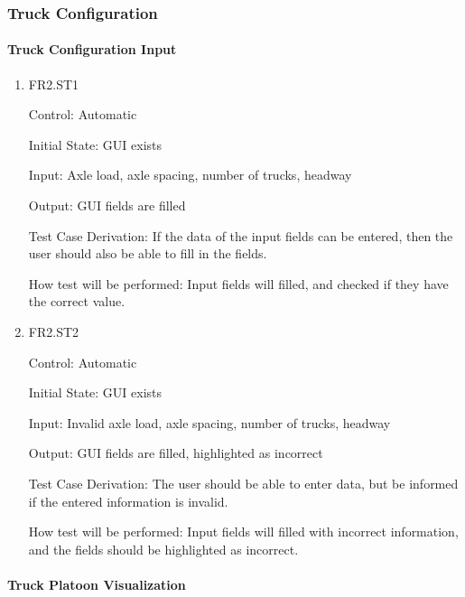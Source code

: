 \documentclass[12pt, titlepage]{article}
\begin{document}
\subsubsection{Truck Configuration}

\paragraph{Truck Configuration Input}

\begin{enumerate}

  \item{FR2.ST1\\}

  Control: Automatic

  Initial State: GUI exists

  Input: Axle load, axle spacing, number of trucks, headway

  Output: GUI fields are filled

  Test Case Derivation: If the data of the input fields can be entered, then the user
  should also be able to fill in the fields.

  How test will be performed: Input fields will filled, and checked if they have the
  correct value.

  \item{FR2.ST2\\}

  Control: Automatic

  Initial State: GUI exists

  Input: Invalid axle load, axle spacing, number of trucks, headway

  Output: GUI fields are filled, highlighted as incorrect

  Test Case Derivation: The user should be able to enter data, but be informed if the
  entered information is invalid.

  How test will be performed: Input fields will filled with incorrect information, 
  and the fields should be highlighted as incorrect.

\end{enumerate}

\paragraph{Truck Platoon Visualization}
\end{document}
